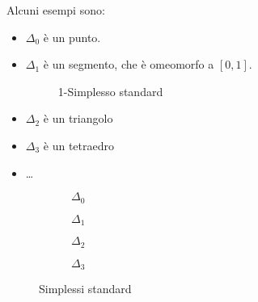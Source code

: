 \begin{osservation} Alcuni esempi sono:
  \begin{itemize}
  \item $ \Delta_0 $ è un punto.
  \item $ \Delta_1 $ è un segmento, che è omeomorfo a $ [0,1] $.
    \begin{figure}[htbp]
      \centering
      \caption{1-Simplesso standard}
      \label{fig:lez1:1_standard_simplex}
    \end{figure}
  \item $ \Delta_2 $ è un triangolo
  \item $ \Delta_3 $ è un tetraedro
  \item \dots
  \end{itemize}
\end{osservation}
\begin{figure}[htbp]
  \centering
  \begin{subfigure}{.2\textwidth}
    \centering
    \caption{$ \Delta_0 $}
  \end{subfigure}
  \begin{subfigure}{.2\textwidth}
    \centering
    \caption{$ \Delta_1 $}
  \end{subfigure}
  \begin{subfigure}{.2\textwidth}
    \centering
    \caption{$ \Delta_2 $}
  \end{subfigure}
  \begin{subfigure}{.33\textwidth}
    \centering
    \def\svgwidth{0.56\textwidth}
    
    \caption{$ \Delta_3 $}
  \end{subfigure}%
  \caption{Simplessi standard}
  \label{fig:lez1:standard_simplexes}
\end{figure}

